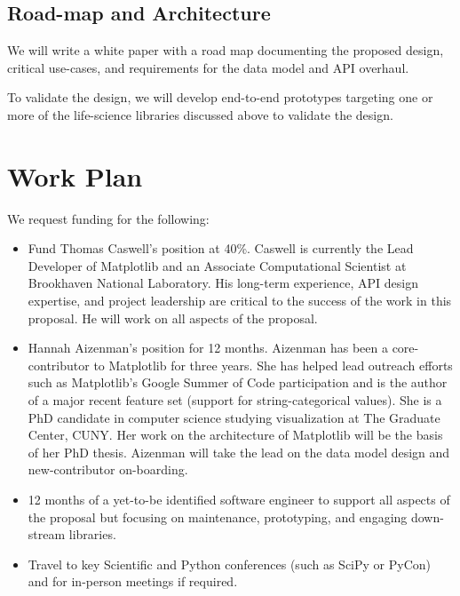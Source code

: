 \documentclass[11pt,letterpaper]{article}  %
\begin{document}
\subsection{Road-map and Architecture}

We will write a white paper with a road map documenting the proposed
design, critical use-cases, and requirements for the data model and
API overhaul.

To validate the design, we will develop end-to-end prototypes
targeting one or more of the life-science libraries discussed above
to validate the design.


\section{Work Plan}

We request funding for the following:


\begin{itemize}[noitemsep]

\item Fund Thomas Caswell's position at 40\%.  Caswell is
  currently the Lead Developer of Matplotlib and an Associate
  Computational Scientist at Brookhaven National Laboratory.  His
  long-term experience, API design expertise, and project leadership
  are critical to the success of the work in this proposal.  He will work
  on all aspects of the proposal.
\item Hannah Aizenman's position for 12 months.  Aizenman has
  been a core-contributor to Matplotlib for three years. She has helped lead outreach efforts such as
  Matplotlib's Google Summer of Code participation and is the author of a major recent feature set 
  (support for string-categorical values).
  She is a PhD candidate in computer science studying visualization at The
  Graduate Center, CUNY.  Her work on the architecture of
  Matplotlib will be the basis of her PhD thesis.  Aizenman will take
  the lead on the data model design and new-contributor on-boarding.
\item 12 months of a yet-to-be identified software engineer to
  support all aspects of the proposal but focusing on maintenance,
  prototyping, and engaging down-stream libraries.
\item Travel to key Scientific and Python conferences (such as SciPy
  or PyCon) and for in-person meetings if required.
\end{itemize}
\end{document}
